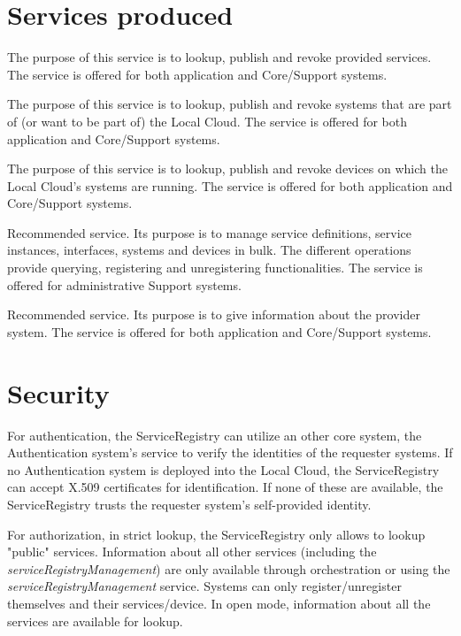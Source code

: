 \documentclass[a4paper]{arrowhead}
\begin{document}
\newpage

\section{Services produced}
\label{sec:services}

{}
The purpose of this service is to lookup, publish and revoke provided services. The service is offered for both application and Core/Support systems. 

The purpose of this service is to lookup, publish and revoke systems that are part of (or want to be part of) the Local Cloud. The service is offered for both application and Core/Support systems. 

The purpose of this service is to lookup, publish and revoke devices on which the Local Cloud's systems are running. The service is offered for both application and Core/Support systems. 

Recommended service.  Its purpose is to manage service definitions, service instances, interfaces, systems and devices in bulk. The different operations provide querying, registering and unregistering functionalities. The service is offered for administrative Support systems. 

Recommended service. Its purpose is to give information about the provider system. The service is offered for both application and Core/Support systems.

\newpage

\section{Security}
\label{sec:security}

For authentication, the ServiceRegistry can utilize an other core system, the Authentication system's service to verify the identities of the requester systems. If no Authentication system is deployed into the Local Cloud, the ServiceRegistry can accept X.509 certificates for identification. If none of these are available, the ServiceRegistry trusts the requester system's self-provided identity.

For authorization, in strict lookup, the ServiceRegistry only allows to lookup "public" services. Information about all other services (including the \textit{serviceRegistryManagement}) are only available through orchestration or using the \textit{serviceRegistryManagement} service. Systems can only register/unregister themselves and their services/device. In open mode, information about all the services are available for lookup.
\end{document}
